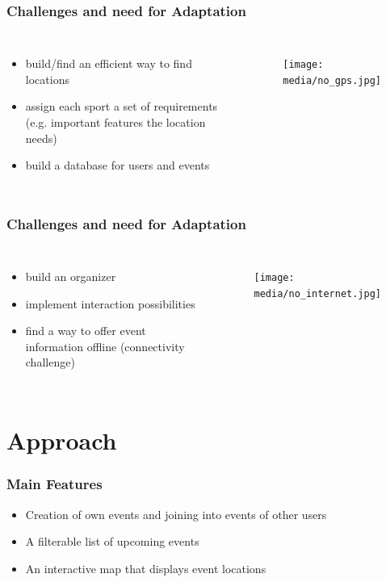 \documentclass[aspectratio=169]{beamer}
\begin{document}
	\begin{frame}
		\frametitle{Challenges and need for Adaptation}
		\begin{columns}
			\begin{itemize}
				\item build/find an efficient way to find locations
				\item assign each sport a set of requirements (e.g. important features the location needs)
				\item build a database for users and events
			\end{itemize}
			 \begin{figure}
				 \centering
				\texttt{[image: media/no\_gps.jpg]}
			\end{figure}
		\end{columns}
	\end{frame}
	
	\begin{frame}
		\frametitle{Challenges and need for Adaptation}
		\begin{columns}
		  \column{0.4\linewidth} 
			\begin{itemize}
				\item build an organizer 
				\item implement interaction possibilities
				\item find a way to offer event information offline (connectivity challenge)
			\end{itemize}
		\column{0.6\linewidth}   
			 \begin{figure}
			 \centering
			\texttt{[image: media/no\_internet.jpg]}
		\end{figure}
		\end{columns}
	\end{frame}

\section{Approach}

	\begin{frame}
		\frametitle{Main Features}
		\begin{itemize}
			\item Creation of own events and joining into events of other users
			\item A filterable list of upcoming events
			\item An interactive map that displays event locations
		\end{itemize}
	\end{frame}
\end{document}
